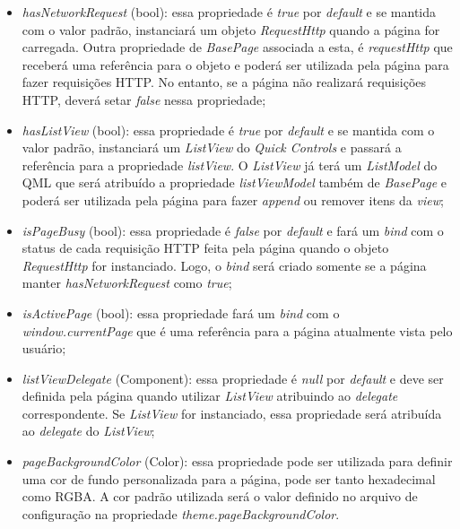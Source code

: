 \begin{itemize}
	\item \textit{hasNetworkRequest} (bool): essa propriedade é \textit{true} por \textit{default} e se mantida com o valor padrão, instanciará um objeto \textit{RequestHttp} quando a página for carregada. Outra propriedade de \textit{BasePage} associada a esta, é \textit{requestHttp} que receberá uma referência para o objeto e poderá ser utilizada pela página para fazer requisições HTTP. No entanto, se a página não realizará requisições HTTP, deverá setar \textit{false} nessa propriedade;

	\item \textit{hasListView} (bool): essa propriedade é \textit{true} por \textit{default} e se mantida com o valor padrão, instanciará um \textit{ListView} do \textit{Quick Controls} e passará a referência para a propriedade \textit{listView}. O \textit{ListView} já terá um \textit{ListModel} do QML que será atribuído a propriedade \textit{listViewModel} também de \textit{BasePage} e poderá ser utilizada pela página para fazer \textit{append} ou remover itens da \textit{view};

	\item \textit{isPageBusy} (bool): essa propriedade é \textit{false} por \textit{default} e fará um \textit{bind} com o status de cada requisição HTTP feita pela página quando o objeto \textit{RequestHttp} for instanciado. Logo, o \textit{bind} será criado somente se a página manter \textit{hasNetworkRequest} como \textit{true};

	\item \textit{isActivePage} (bool): essa propriedade fará um \textit{bind} com o \textit{window.currentPage} que é uma referência para a página atualmente vista pelo usuário;

	\item \textit{listViewDelegate} (Component): essa propriedade é \textit{null} por \textit{default} e deve ser definida pela página quando utilizar \textit{ListView} atribuindo ao \textit{delegate} correspondente. Se \textit{ListView} for instanciado, essa propriedade será atribuída ao \textit{delegate} do \textit{ListView};

	\item \textit{pageBackgroundColor} (Color): essa propriedade pode ser utilizada para definir uma cor de fundo personalizada para a página, pode ser tanto hexadecimal como RGBA. A cor padrão utilizada será o valor definido no arquivo de configuração na propriedade \textit{theme.pageBackgroundColor}.
\end{itemize}

